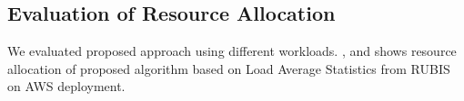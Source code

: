 \subsection{Evaluation of Resource Allocation}
We evaluated proposed approach using different workloads. \label{stratos} , \label{reactive} and \label{proactive} shows resource allocation of proposed algorithm based on Load Average Statistics from RUBIS on AWS deployment.
